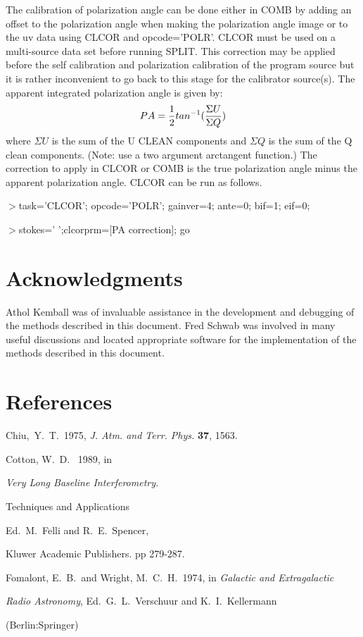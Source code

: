 \begin{enumerate}
   The calibration of polarization angle can be done either in COMB by
adding an offset to the polarization angle when making the
polarization angle image or to the uv data using CLCOR and
opcode='POLR'.  CLCOR must be used on a multi-source data set before
running SPLIT.  This correction may be applied before the self
calibration and polarization calibration of the program source but it
is rather inconvenient to go back to this stage for the calibrator
source(s).
   The apparent integrated polarization angle is given by:
$$PA = {1\over{2}} tan^{-1} ({\Sigma U\over{\Sigma Q}}) $$
where $\Sigma U$ is the sum of the U CLEAN components and $\Sigma Q$
is the sum of the Q clean components.  (Note: use a two argument
arctangent function.)  The correction to apply in
CLCOR or COMB is the true polarization angle minus the apparent
polarization angle. CLCOR can be run as follows.
\par\noindent
$>$task='CLCOR'; opcode='POLR'; gainver=4; ante=0; bif=1; eif=0;
\par\noindent
$>$stokes=' ';clcorprm=[PA correction]; go

\end {enumerate}

\vfil\eject
\section{Acknowledgments}
   Athol Kemball was of invaluable assistance in the development and
debugging of the methods described in this document.  Fred Schwab  was
involved in many useful discussions and located appropriate software
for the implementation of the methods described in this document.

\section{References }
\par\noindent
Chiu,~Y.~T.~1975, {\it J. Atm. and Terr. Phys.} {\bf 37}, 1563.

\par\noindent
Cotton, W.~D. ~1989, in {\it Very Long Baseline Interferometry.
\par\parindent 30pt
Techniques and Applications} Ed.~M.~Felli and R.~E.~Spencer,

\par\parindent 30pt
Kluwer Academic Publishers.  pp 279-287.

\par\noindent
Fomalont, E.~B.~and Wright, M.~C.~H.~1974, in {\it Galactic and Extragalactic}
\par\parindent 30pt
{\it Radio Astronomy}, Ed.~G.~L.~Verschuur and K.~I.~Kellermann
\par\parindent 30pt
(Berlin:Springer)

